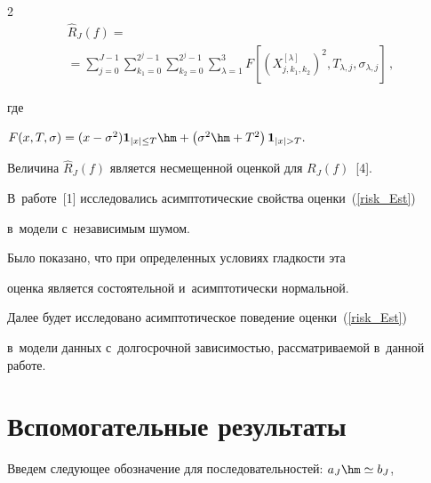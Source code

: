 \begin{multicols}{2}
\begin{multline}


\label{risk_Est}


\widehat{R}_J (f) = {}\\


{}=\sum\limits_{j=0}^{J-1} \sum\limits_{k_1=0}^{2^j-1}


\sum\limits_{k_2=0}^{2^j-1} \sum\limits_{\lambda=1}^3 F\left[


\left(X_{j,k_1,k_2}^{[\lambda]}


\right)^2,T_{\lambda,j},\sigma_{\lambda,j}\right]\,,


\end{multline}


где


$F(x,T,\sigma) = (x - \sigma^2)\mathbf{1}_{|x|\leq T} \hm+


\left(\sigma^2\hm + T^2\right)\mathbf{1}_{|x|>T}.


$


Величина $\widehat{R}_J(f)$ является несмещенной оценкой для $R_J(f)$~[4].


В~работе~[1] исследовались асимптотические свойства оценки~(\ref{risk_Est})


в~модели с~независимым шумом.


Было показано, что при определенных условиях гладкости эта


оценка является состоятельной и~асимптотически нормальной.


Далее будет исследовано асимптотическое поведение оценки~(\ref{risk_Est})


в~модели данных с~долгосрочной зависимостью, рассматриваемой в~данной работе.





\vspace*{-5pt}





\section{Вспомогательные результаты}





\vspace*{-2pt}





Введем следующее обозначение для последовательностей: $a_J\hm\simeq b_J$,



\end{multicols}
